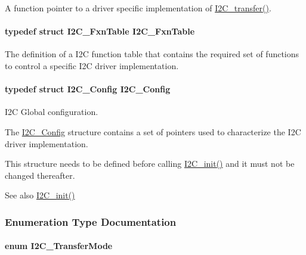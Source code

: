 A function pointer to a driver specific implementation of \hyperlink{_i2_c_8h_ac5d827b67fe77d7d179026941cc069d7}{I2\+C\+\_\+transfer()}. 

\paragraph[{I2\+C\+\_\+\+Fxn\+Table}]{\setlength{\rightskip}{0pt plus 5cm}typedef struct {\bf I2\+C\+\_\+\+Fxn\+Table}  {\bf I2\+C\+\_\+\+Fxn\+Table}}\label{_i2_c_8h_abdc2b5945fac9724271b088437881d68}


The definition of a I2\+C function table that contains the required set of functions to control a specific I2\+C driver implementation. 

\paragraph[{I2\+C\+\_\+\+Config}]{\setlength{\rightskip}{0pt plus 5cm}typedef struct {\bf I2\+C\+\_\+\+Config}  {\bf I2\+C\+\_\+\+Config}}\label{_i2_c_8h_a06eeddd0e8a5dd24a18566b65099d588}


I2\+C Global configuration. 

The \hyperlink{struct_i2_c___config}{I2\+C\+\_\+\+Config} structure contains a set of pointers used to characterize the I2\+C driver implementation.

This structure needs to be defined before calling \hyperlink{_i2_c_8h_a9ff51ddf1d325776fef90cce0223772b}{I2\+C\+\_\+init()} and it must not be changed thereafter.

\begin{DoxySeeAlso}{See also}
\hyperlink{_i2_c_8h_a9ff51ddf1d325776fef90cce0223772b}{I2\+C\+\_\+init()} 
\end{DoxySeeAlso}


\subsubsection{Enumeration Type Documentation}
\paragraph[{I2\+C\+\_\+\+Transfer\+Mode}]{\setlength{\rightskip}{0pt plus 5cm}enum {\bf I2\+C\+\_\+\+Transfer\+Mode}}\label{_i2_c_8h_a39f3b9340fc4ee241b0d2da9b2841c26}


